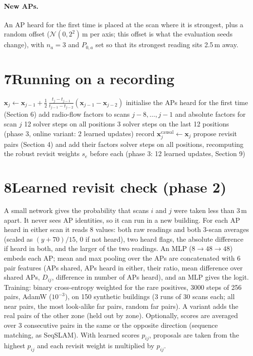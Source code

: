 \documentclass[11pt]{article}
\newcommand{\x}{\mathbf{x}}
\begin{document}
\paragraph{New APs.} An AP heard for the first time is placed at the scan where it is strongest, plus a
random offset ($\mathcal{N}(0,2^2)$\,m per axis; this offset is what the evaluation seeds change), with
$n_a=3$ and $P_{0,a}$ set so that its strongest reading sits 2.5\,m away.

\section*{7\quad Running on a recording}
\begin{algorithm}[h]
\caption{Radio Flow SLAM, one scan at a time (frontend), then one global solve (backend)}
\begin{algorithmic}[1]
  \State $\x_j\gets\x_{j-1}+\tfrac12\,\tfrac{t_j-t_{j-1}}{t_{j-1}-t_{j-2}}(\x_{j-1}-\x_{j-2})$ 
  \State initialise the APs heard for the first time (Section 6)
  \State add radio-flow factors to scans $j-8,\dots,j-1$ and absolute factors for scan $j$
   12 solver steps on all positions 
   3 solver steps on the last 12 positions 
    \State (phase 3, online variant: 2 learned updates)
  \EndIf
  \State record $\x^{\text{causal}}_j\gets\x_j$ 
\EndFor
\State propose revisit pairs (Section 4) and add their factors
 solver steps on all positions, recomputing the robust revisit weights $s_e$ before each
\State (phase 3: 12 learned updates, Section 9)
\end{algorithmic}
\end{algorithm}

\section*{8\quad Learned revisit check (phase 2)}
A small network gives the probability that scans $i$ and $j$ were taken less than 3\,m apart. It never sees
AP identities, so it can run in a new building. For each AP heard in either scan it reads 8 values: both
raw readings and both 3-scan averages (scaled as $(y+70)/15$, 0 if not heard), two heard flags, the absolute
difference if heard in both, and the larger of the two readings. An MLP ($8\to48\to48$) embeds each AP; mean
and max pooling over the APs are concatenated with 6 pair features (APs shared, APs heard in either, their
ratio, mean difference over shared APs, $D_{ij}$, difference in number of APs heard), and an MLP gives the logit.
Training: binary cross-entropy weighted for the rare positives, 3000 steps of 256 pairs, AdamW ($10^{-3}$),
on 150 synthetic buildings (3 runs of 30 scans each; all near pairs, the most look-alike far pairs, random far
pairs). A variant adds the real pairs of the other zone (held out by zone). Optionally, scores are averaged
over 3 consecutive pairs in the same or the opposite direction (sequence matching, as SeqSLAM). With learned
scores $p_{ij}$, proposals are taken from the highest $p_{ij}$ and each revisit weight is multiplied by $p_{ij}$.
\end{document}
